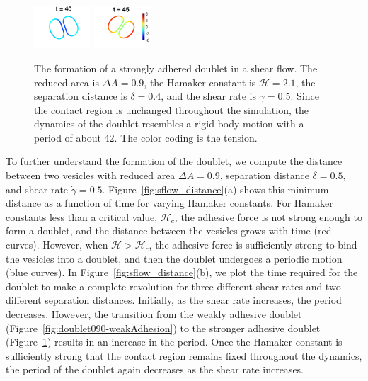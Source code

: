 \documentclass[prf,superscriptaddress,showkeys,longbibliography]{revtex4-1}
\begin{document}
\begin{figure}[htp]
  \includegraphics[width=0.19\textwidth]{figs/adR4em1adS2p1e0Chi5em1_ra090_image09.png}
  \includegraphics[width=0.19\textwidth]{figs/adR4em1adS2p1e0Chi5em1_ra090_image10.png}
  \caption{\label{fig:doublet090-strongAdhesion} The formation of a
  strongly adhered doublet in a shear flow.  The reduced area is $\Delta
  A = 0.9$, the Hamaker constant is $\mathcal{H}=2.1$, the separation
  distance is $\delta = 0.4$, and the shear rate is $\dot\gamma=0.5$.
  Since the contact region is unchanged throughout the simulation, the
  dynamics of the doublet resembles a rigid body motion with a period of
  about 42.  The color coding is the tension.}
\end{figure}

To further understand the formation of the doublet, we compute the
distance between two vesicles with reduced area $\Delta A = 0.9$,
separation distance $\delta = 0.5$, and shear rate $\dot\gamma = 0.5$.
Figure~\ref{fig:sflow_distance}(a) shows this minimum distance as a
function of time for varying Hamaker constants.  For Hamaker constants
less than a critical value, $\mathcal{H}_c$, the adhesive force is not
strong enough to form a doublet, and the distance between the vesicles
grows with time (red curves).  However, when $\mathcal{H} >
\mathcal{H}_c$, the adhesive force is sufficiently strong to bind the
vesicles into a doublet, and then the doublet undergoes a periodic
motion (blue curves).  In Figure~\ref{fig:sflow_distance}(b), we plot
the time required for the doublet to make a complete revolution for
three different shear rates and two different separation distances.
Initially, as the shear rate increases, the period decreases.  However,
the transition from the weakly adhesive doublet
(Figure~\ref{fig:doublet090-weakAdhesion}) to the stronger adhesive
doublet (Figure~\ref{fig:doublet090-strongAdhesion}) results in an
increase in the period.  Once the Hamaker constant is sufficiently
strong that the contact region remains fixed throughout the dynamics,
the period of the doublet again decreases as the shear rate increases.
\end{document}
